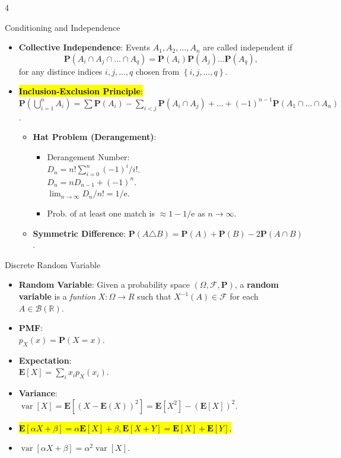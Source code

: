\documentclass[landscape,a4paper]{article}
\renewcommand{\emph}[1]{\hl{#1}}
\newcommand{\e}{\mathrm{e}}
\newcommand{\PP}{\mathbf{P}}
\newcommand{\EE}{\mathbf{E}}
\newcommand{\var}{\operatorname{var}}
\begin{document}
\begin{multicols*}{4}
\begin{card}{Conditioning and Independence}
\begin{itemize}
			\item \textbf{Collective Independence}: Events $A_1,A_2,\dots, A_n$ are called independent if
			\[
			\PP(A_i\cap A_j\cap \dots\cap A_q)=\PP(A_i)\PP(A_j)\dots\PP(A_q),
			\]
			for any distince indices $i,j,\dots,q$ chosen from $\left\{i,j,\dots,q\right\}$.
			\item \emph{\textbf{Inclusion-Exclusion Principle}:}
			$\PP\left(\bigcup_{i=1}^n A_i\right) = \sum \PP(A_i) - \sum_{i<j} \PP(A_i \cap A_j) + \dots + (-1)^{n-1} \PP(A_1 \cap \dots \cap A_n)$.
			\begin{itemize}
				\item \textbf{Hat Problem (Derangement)}: 
				\begin{itemize}
					\item Derangement Number:\\ $D_n=n!\sum_{i=0}^n(-1)^i/i!$.\\
					$D_n=nD_{n-1}+(-1)^n$.\\
					$\lim_{n\to\infty} D_n/n!=1/\e$.
					\item Prob. of at least one match is $\approx 1 - 1/\e$ as $n\to\infty$.
				\end{itemize}
				\item \textbf{Symmetric Difference}: $\PP(A \triangle B) = \PP(A) + \PP(B) - 2\PP(A \cap B)$.
			\end{itemize}
			\end{itemize}
		\end{card}
		\begin{card}{Discrete Random Variable}
			\begin{itemize}
				\item \textbf{Random Variable}: Given a probability space $(\Omega,\mathcal F,\PP)$, a \textbf{random variable} is a \textit{funtion} $X\colon \Omega\to R$ such that $X^{-1}(A)\in\mathcal F$ for each $A\in\mathcal B(\mathbb R)$.
				\item \textbf{PMF}:\\ $p_X(x)=\PP(X=x)$.
				\item \textbf{Expectation}:\\ $\EE[X]=\sum_ix_ip_X(x_i)$.
				\item \textbf{Variance}:\\ $\var[X]=\EE\left[\left(X-\EE(X)\right)^2\right]=\EE[X^2]-\left(\EE[X]\right)^2$.
				\item \emph{$\EE[\alpha X+ \beta]=\alpha\EE[X]+\beta,\EE[X+Y]=\EE[X]+\EE[Y].$}
				\item $\var[\alpha X+\beta]=\alpha^2\var[X]$.

\end{itemize}
\end{card}
\end{multicols*}
\end{document}
